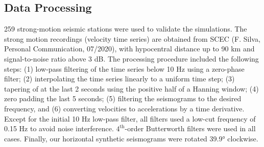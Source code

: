 \subsection{Data Processing}
259 strong-motion seismic stations were used to validate the simulations. The strong motion recordings (velocity time series) are obtained from SCEC (F. Silva, Personal Communication, 07/2020), with hypocentral distance up to 90 km and signal-to-noise ratio above 3 dB. The processing procedure included the following steps: (1) low-pass filtering of the time series below 10 Hz using a zero-phase filter; (2) interpolating the time series linearly to a uniform time step; (3) tapering of at the last 2 seconds using the positive half of a Hanning window; (4) zero padding the last 5 seconds; (5) filtering the seismograms to the desired frequency, and (6) converting velocities to accelerations by a time derivative. Except for the initial 10 Hz low-pass filter, all filters used a low-cut frequency of 0.15 Hz to avoid noise interference. $4^{\text{th}}$-order Butterworth filters were used in all cases. Finally, our horizontal synthetic seismograms were rotated 39.9° clockwise.

